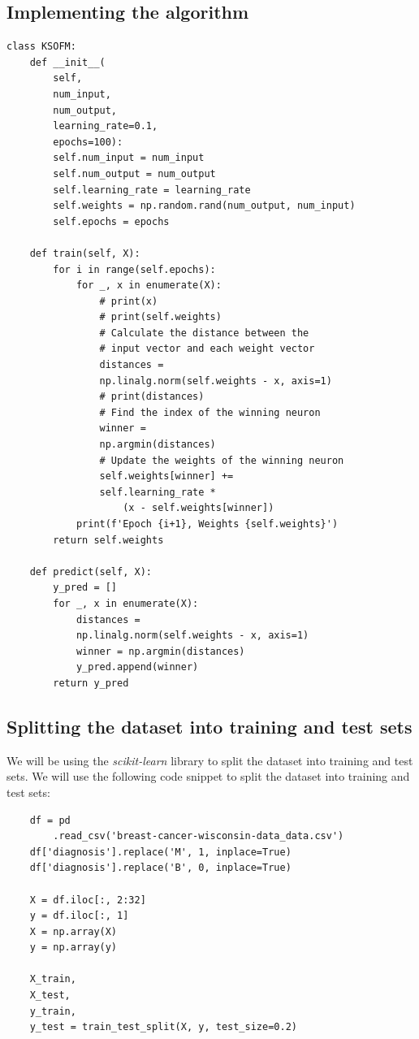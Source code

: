 \subsection{Implementing the algorithm}
\begin{verbatim}
class KSOFM:
    def __init__(
        self, 
        num_input, 
        num_output, 
        learning_rate=0.1, 
        epochs=100):
        self.num_input = num_input
        self.num_output = num_output
        self.learning_rate = learning_rate
        self.weights = np.random.rand(num_output, num_input)
        self.epochs = epochs
    
    def train(self, X):
        for i in range(self.epochs):
            for _, x in enumerate(X):
                # print(x)
                # print(self.weights)
                # Calculate the distance between the 
                # input vector and each weight vector
                distances = 
                np.linalg.norm(self.weights - x, axis=1)
                # print(distances)
                # Find the index of the winning neuron
                winner = 
                np.argmin(distances)
                # Update the weights of the winning neuron
                self.weights[winner] += 
                self.learning_rate * 
                    (x - self.weights[winner])
            print(f'Epoch {i+1}, Weights {self.weights}')
        return self.weights
    
    def predict(self, X):
        y_pred = []
        for _, x in enumerate(X):
            distances = 
            np.linalg.norm(self.weights - x, axis=1)
            winner = np.argmin(distances)
            y_pred.append(winner)
        return y_pred
\end{verbatim}
\subsection{Splitting the dataset into training and test sets}
We will be using the \textit{scikit-learn} library to split the dataset into training and test sets. We will use the following code snippet to split the dataset into training and test sets:
\begin{verbatim}
    df = pd
        .read_csv('breast-cancer-wisconsin-data_data.csv')
    df['diagnosis'].replace('M', 1, inplace=True)
    df['diagnosis'].replace('B', 0, inplace=True)
    
    X = df.iloc[:, 2:32]
    y = df.iloc[:, 1]
    X = np.array(X)
    y = np.array(y)
        
    X_train, 
    X_test, 
    y_train, 
    y_test = train_test_split(X, y, test_size=0.2)
\end{verbatim}
